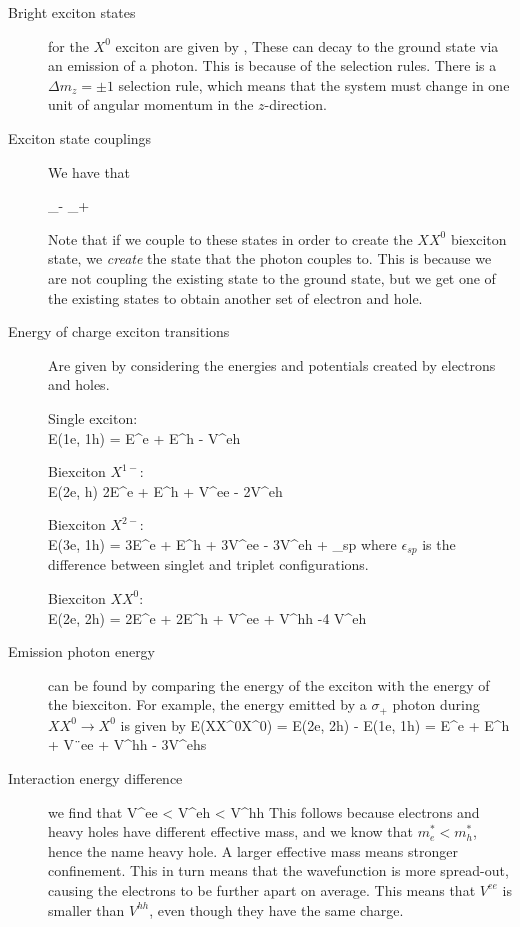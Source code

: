 \begin{description}
\item[Bright exciton states] for the $X^0$ exciton are given by 
\beq
\ket{\uparrow \Downarrow} , \ket{\downarrow, \Uparrow}
\eeq
These can decay to the ground state via an emission of a photon. This is because of the selection rules. There is a $\Delta m_z = \pm 1$ selection rule, which means that the system must change in one unit of angular momentum in the $z$-direction. 

\item[Exciton state couplings] We have that 

\beq
\sigma_- \ket{\uparrow \Downarrow} \rightarrow {}
\eeq
\beq
\sigma_+ \ket{\downarrow \Uparrow} \rightarrow {}
\eeq

Note that if we couple to these states in order to create the $XX^0$ biexciton state, we \emph{create} the state that the photon couples to. This is because we are not coupling the existing state to the ground state, but we get one of the existing states to obtain another set of electron and hole. 

\item[Energy of charge exciton transitions] Are given by considering the energies and potentials created by electrons and holes. 

Single exciton: \\
\beq
E(1e, 1h) = E^e + E^h - V^{eh}
\eeq

Biexciton $X^{1-}$: \\
\beq
E(2e, h) 2E^e + E^h + V^{ee} - 2V^{eh}
\eeq

Biexciton $X^{2-}$: \\
\beq
E(3e, 1h) = 3E^e + E^h + 3V^{ee} - 3V^{eh} + \epsilon_{sp}
\eeq
where $\epsilon_{sp}$ is the difference between singlet and triplet configurations. 

Biexciton $XX^0$: \\
\beq
E(2e, 2h) = 2E^e + 2E^h + V^{ee} + V^{hh} -4 V^{eh}
\eeq

\item[Emission photon energy] can be found by comparing the energy of the exciton with the energy of the biexciton. For example, the energy emitted by a $\sigma_+	$ photon during $XX^0 \rightarrow X^0$ is given by 
\beq
\Delta E(XX^0\rightarrow X^0) = E(2e, 2h) - E(1e, 1h) = E^e + E^h + V¨{ee} + V^{hh} - 3V^{eh}s
\eeq



\item[Interaction energy difference] we find that
\beq
V^{ee} < V^{eh} < V^{hh}
\eeq
This follows because electrons and heavy holes have different effective mass, and we know that $m^*_e < m^*_h$, hence the name heavy hole. A larger effective mass means stronger confinement. This in turn means that the wavefunction is more spread-out, causing the electrons to be further apart on average. This means that $V^{ee}$ is smaller than $V^{hh}$, even though they have the same charge. 


\end{description}
